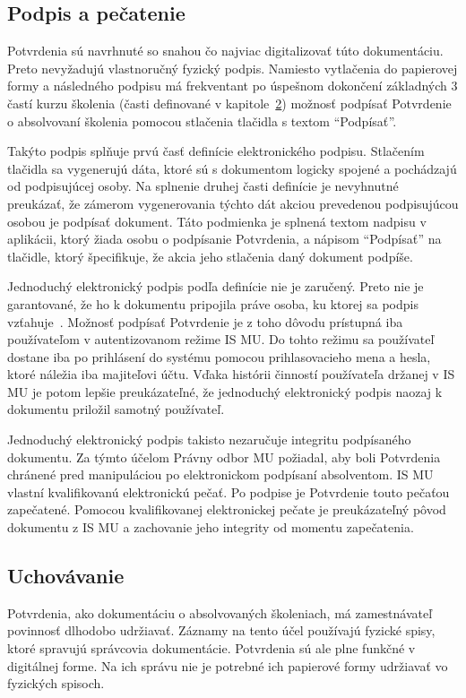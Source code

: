 \documentclass[
  digital,     %
  oneside,     %
  nosansbold,  %
  nocolorbold, %
  lof,         %
  nolot,         %
]{fithesis4}
\begin{document}
\subsection*{Podpis a pečatenie}
Potvrdenia sú navrhnuté so snahou čo najviac digitalizovať túto dokumentáciu. Preto nevyžadujú vlastnoručný fyzický podpis. Namiesto vytlačenia do papierovej formy a následného podpisu má frekventant po úspešnom dokončení základných 3 častí kurzu školenia (časti definované v kapitole~\hyperref[kap-2]{2}) možnosť podpísať Potvrdenie o absolvovaní školenia pomocou stlačenia tlačidla s textom \enquote{Podpísať}. 

Takýto podpis splňuje prvú časť definície elektronického podpisu. Stlačením tlačidla sa vygenerujú dáta, ktoré sú s dokumentom logicky spojené a pochádzajú od podpisujúcej osoby. Na splnenie druhej časti definície je nevyhnutné preukázať, že zámerom vygenerovania týchto dát akciou prevedenou podpisujúcou osobou je podpísať dokument. Táto podmienka je splnená textom nadpisu v aplikácii, ktorý žiada osobu o podpísanie Potvrdenia, a nápisom \enquote{Podpísať} na tlačidle, ktorý špecifikuje, že akcia jeho stlačenia daný dokument podpíše.

Jednoduchý elektronický podpis podľa definície nie je zaručený. Preto nie je garantované, že ho k dokumentu pripojila práve osoba, ku ktorej sa podpis vzťahuje~\cite{navara2021}. Možnosť podpísať Potvrdenie je z toho dôvodu prístupná iba používateľom v autentizovanom režime IS MU. Do tohto režimu sa používateľ dostane iba po prihlásení do systému pomocou prihlasovacieho mena a hesla, ktoré náležia iba majiteľovi účtu. Vďaka histórii činností používateľa držanej v IS MU je potom lepšie preukázateľné, že jednoduchý elektronický podpis naozaj k dokumentu priložil samotný používateľ.

Jednoduchý elektronický podpis takisto nezaručuje integritu podpísaného dokumentu. Za týmto účelom Právny odbor MU požiadal, aby boli Potvrdenia chránené pred manipuláciou po elektronickom podpísaní absolventom. IS MU vlastní kvalifikovanú elektronickú pečať. Po podpise je Potvrdenie touto pečaťou zapečatené. Pomocou kvalifikovanej elektronickej pečate je preukázateľný pôvod dokumentu z IS MU a zachovanie jeho integrity od momentu zapečatenia.

\subsection{Uchovávanie}
Potvrdenia, ako dokumentáciu o absolvovaných školeniach, má zamestnávateľ povinnosť dlhodobo udržiavať. Záznamy na tento účel používajú fyzické spisy, ktoré spravujú správcovia dokumentácie. Potvrdenia sú ale plne funkčné v digitálnej forme. Na ich správu nie je potrebné ich papierové formy udržiavať vo fyzických spisoch.
\end{document}
